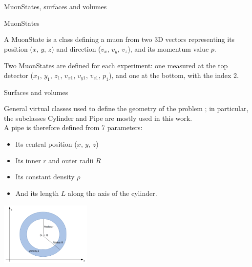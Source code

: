 \documentclass[8 pt]{beamer}
\begin{document}
\begin{frame}{MuonStates, surfaces and volumes}
\justifying
\begin{exampleblock}{} MuonStates \end{exampleblock}
A MuonState is a class defining a muon from two 3D vectors representing its position ($x$, $y$, $z$) and direction ($v_x$, $v_y$, $v_z$), and its momentum value $p$. \\ \vspace{10pt}

Two MuonStates are defined for each experiment: one measured at the top detector ($x_1$, $y_1$, $z_1$, $v_{x1}$, $v_{y1}$, $v_{z1}$, $p_1$), and one at the bottom, with the index 2. \vfill

\begin{minipage}[c]{.65\textwidth}
\begin{exampleblock}{} Surfaces and volumes \end{exampleblock}
\justifying
General virtual classes used to define the geometry of the problem ; in particular, the subclasses Cylinder and Pipe are mostly used in this work. 
\\ \vspace{5pt}
A pipe is therefore defined from 7 parameters: 
\begin{itemize}
\item Its central position ($x$, $y$, $z$)
\item Its inner $r$ and outer radii $R$
\item Its constant density $\rho$
\item And its length $L$ along the axis of the cylinder.
\end{itemize}
\end{minipage}
\begin{minipage}[c]{.33\textwidth}
\includegraphics[width=4.5cm, height=3.2cm]{figs/cylinder.png}
\end{minipage} \vfill

\end{frame}
\end{document}

